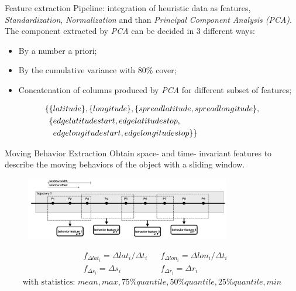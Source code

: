 \documentclass{beamer}
\begin{document}
\begin{frame}{Feature extraction}
Pipeline: integration of heuristic data as features, \textit{Standardization}, \textit{Normalization} and than \textit{Principal Component Analysis (PCA)}. 
\vfill
The component extracted by \textit{PCA} can be decided in 3 different ways:
\begin{itemize}
	\item By a number a priori;
	\item By the cumulative variance with $80\%$ cover;
	\item Concatenation of columns produced by \textit{PCA} for different subset of features;
\end{itemize}
\begin{align}
\{ &\{ latitude\} , \{longitude\}, \{spread\-latitude, spread\-longitude\}, \notag\\
&\{edge\-latitude\-start, edge\-latitude\-stop, \notag\\ 
&\phantom{\{}edge\-longitude\-start, edge\-longitude\-stop\} \}\notag
\end{align} 
\end{frame}

\begin{frame}{Moving Behavior Extraction}
	Obtain space- and time- invariant features to describe the moving behaviors of the object with a sliding window.
	\begin{figure}
		\centering
		\includegraphics[width=0.8\textwidth]{moving-behavior-feature}
		\label{fig:moving-behavior-feature}
	\end{figure}
	\begin{align*}
		&f_{\Delta lat_i} = \Delta lat_i / \Delta t_i && f_{\Delta lon_i} = \Delta lon_i / \Delta t_i\\
		&f_{\Delta s_i} = \Delta s_i && f_{\Delta r_i} = \Delta r_i
	\end{align*}
	\begin{align*}
		\text{with statistics: } {mean, max, 75\%quantile, 50\%quantile, 25\%quantile, min} 
	\end{align*}
\end{frame}
\end{document}
